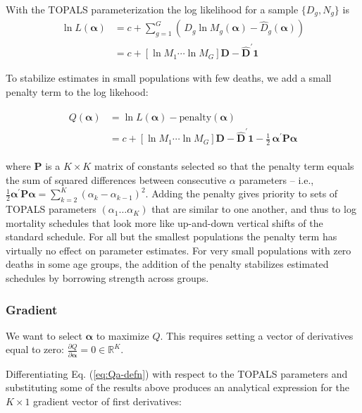 \documentclass{article}
\begin{document}
With the TOPALS parameterization the log likelihood for a sample $\{D_g,N_g\}$ is
$$
\begin{aligned}
  \ln L(\boldsymbol{\alpha}) 
&=  c + \sum_{g=1}^{G} \left(\, D_g \ln M_g(\boldsymbol{\alpha}) - \hat{D}_g(\boldsymbol{\alpha}) \right) \\
&=  c + \left[ \ln M_1 \cdots \ln M_G \right] \boldsymbol{D} -  \hat{\boldsymbol{D}}^\prime \boldsymbol{1} 
 \end{aligned}
$$

\noindent To stabilize estimates in small populations with few deaths, we add a small penalty term to the log likehood:

\begin{align}
\begin{split}
\label{eq:Qa-defn}
  Q(\boldsymbol{\alpha}) 
  &= \ln L(\boldsymbol{\alpha}) - \text{penalty}(\boldsymbol{\alpha}) \\
  &= c + \left[ \ln M_1 \cdots \ln M_G \right] \boldsymbol{D} -  \hat{\boldsymbol{D}}^\prime \boldsymbol{1}  - \tfrac{1}{2}\,\boldsymbol{\alpha}^\prime \boldsymbol{P} \boldsymbol{\alpha}
\end{split}
\end{align}  

\noindent where $\boldsymbol{P}$ is a $K \times K$ matrix of constants selected so that the penalty term equals the sum of squared differences between consecutive  $\alpha$ parameters -- i.e.,  $\tfrac{1}{2}\boldsymbol{\alpha}^\prime \boldsymbol{P} \boldsymbol{\alpha}=\sum_{k=2}^K (\alpha_k-\alpha_{k-1})^2$. Adding the penalty gives priority to sets of TOPALS parameters $(\alpha_1\ldots \alpha_K)$ that are similar to one another, and thus to log mortality schedules that look more like up-and-down vertical shifts of the standard schedule. For all but the smallest populations the penalty term has virtually no effect on parameter estimates. For very small populations with zero deaths in some age groups, the addition of the penalty  stabilizes estimated schedules by borrowing strength across groups. 

\subsubsection{Gradient}

We want to select $\boldsymbol{\alpha}$ to maximize $Q$. This requires setting a vector of derivatives equal to zero: $\frac{\partial Q}{\partial\boldsymbol{\alpha}} = 0 \in \mathbb{R}^K$. 


Differentiating Eq. (\ref{eq:Qa-defn}) with respect to the TOPALS parameters and substituting some of the results above produces an analytical expression for the $K \times 1$ gradient vector of first derivatives: 
\end{document}
